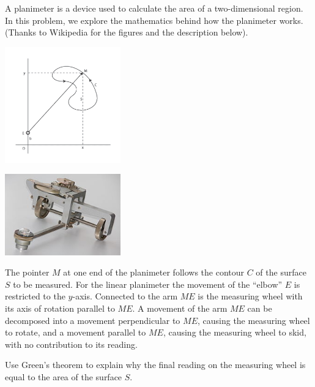 \documentclass{watsonbook}
\begin{document}
\begin{aexercise}
  A planimeter is a device used to calculate the area of a
  two-dimensional region. In this problem, we explore the mathematics
  behind how the planimeter works. (Thanks to Wikipedia for the
  figures and the description below).

  \begin{center}
    \begin{minipage}{5cm}
      \includegraphics[width=5cm]{exercisefigures/planfig}
    \end{minipage}
    \begin{minipage}{5cm}
      \includegraphics[width=5cm]{exercisefigures/planimeter.jpg}
    \end{minipage}
  \end{center}

  The pointer $M$ at one end of the planimeter follows the contour $C$
  of the surface $S$ to be measured. For the linear planimeter the
  movement of the ``elbow'' $E$ is restricted to the
  $y$-axis. Connected to the arm $ME$ is the measuring wheel with its
  axis of rotation parallel to $ME$. A movement of the arm $ME$ can be
  decomposed into a movement perpendicular to $ME$, causing the
  measuring wheel to rotate, and a movement parallel to $ME$, causing
  the measuring wheel to skid, with no contribution to its reading.

  Use Green's theorem to explain why the final reading on the
  measuring wheel is equal to the area of the surface $S$.
\end{aexercise}

\end{document}
